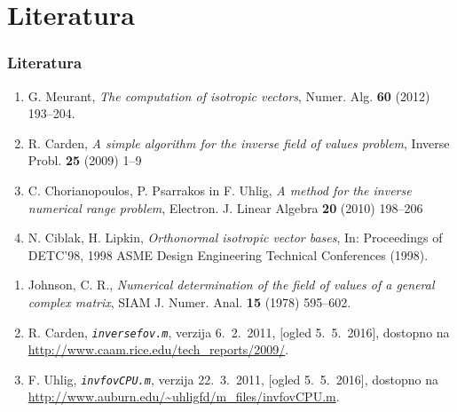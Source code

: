 \documentclass{beamer}
\newcounter{saveenumi}
\newcommand{\seti}{\setcounter{saveenumi}{\value{enumi}}}
\newcommand{\conti}{\setcounter{enumi}{\value{saveenumi}}}
\begin{document}
\section{Literatura}
\begin{frame}
\frametitle{Literatura}
\begin{enumerate}
\item
G. Meurant, \emph{The computation of isotropic vectors}, Numer. Alg. {\bf 60} (2012) 193--204.
\item
R. Carden, \emph{A simple algorithm for the inverse field of values problem}, Inverse Probl. {\bf 25} (2009) 1--9
\item
C. Chorianopoulos, P. Psarrakos in F. Uhlig, \emph{A method for the inverse numerical range problem}, Electron. J. Linear Algebra {\bf 20} (2010) 198--206
\item
N. Ciblak, H. Lipkin, \emph{Orthonormal isotropic vector bases}, In: Proceedings of DETC'98, 1998 ASME Design Engineering Technical Conferences (1998).
\seti
\end{enumerate}
\end{frame}
\begin{frame}
\begin{enumerate}
\conti
\item
Johnson, C. R., \emph{Numerical determination of the field of values of a general complex matrix}, SIAM J. Numer. Anal. {\bf15} (1978) 595--602.
\item 
R. Carden, \emph{\texttt{inversefov.m}}, verzija 6.~2.~2011, [ogled 5.~5.~2016], dostopno na \url{http://www.caam.rice.edu/tech_reports/2009/}.
\item 
F. Uhlig, \emph{\texttt{invfovCPU.m}}, verzija 22.~3.~2011, [ogled 5.~5.~2016], dostopno na \url{http://www.auburn.edu/~uhligfd/m_files/invfovCPU.m}.
\end{enumerate}
\end{frame}
\end{document}
